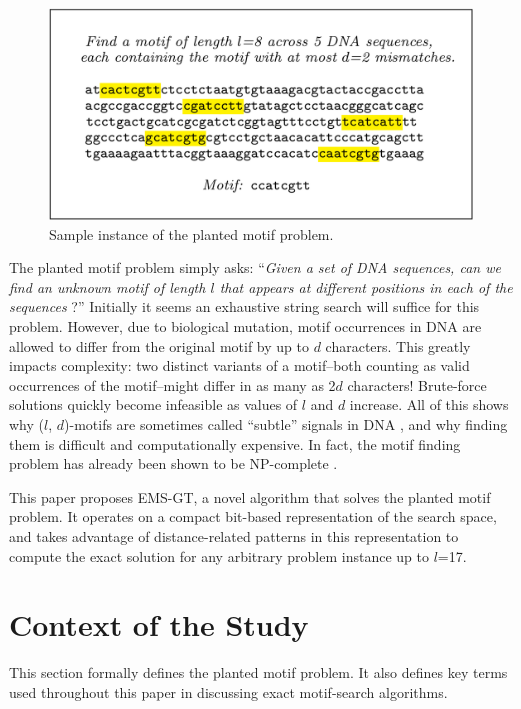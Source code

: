 \documentclass[oneside,12pt]{DISCSthesis}
\begin{document}
	\begin{figure}[h] \label{fig:example}
		\centering
		\includegraphics[width=5.5in]{img/example}
		\caption{Sample instance of the planted motif problem.}
		\end{figure}

	The planted motif problem simply asks: ``\emph{Given a set of DNA sequences, can we find an unknown motif of length $l$ that appears at different positions in each of the sequences} \cite{pevzner2000combinatorial}?'' Initially it seems an exhaustive string search will suffice for this problem. However, due to biological mutation, motif occurrences in DNA are allowed to differ from the original motif by up to $d$ characters. This greatly impacts complexity: two distinct variants of a motif--both counting as valid occurrences of the motif--might differ in as many as 2$d$ characters! Brute-force solutions quickly become infeasible as values of $l$ and $d$ increase. All of this shows why ($l$, $d$)-motifs are sometimes called ``subtle'' signals in DNA  \cite{pevzner2000combinatorial}, and why finding them is difficult and computationally expensive. In fact, the motif finding problem has already been shown to be NP-complete \cite{pms2014}. 

	This paper proposes EMS-GT, a novel algorithm that solves the planted motif problem. It operates on a compact bit-based representation of the search space, and takes advantage of distance-related patterns in this representation to compute the exact solution for any arbitrary problem instance up to $l$=17.

	\section{Context of the Study}
		This section formally defines the planted motif problem. It also defines key terms used throughout this paper in discussing exact motif-search algorithms.\newline
\end{document}

